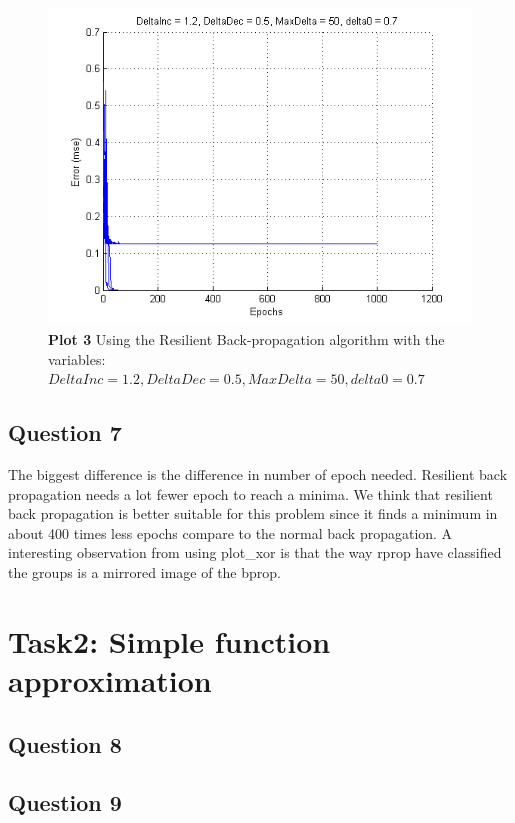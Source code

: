 \documentclass[a4paper]{article}
\begin{document}
\begin{figure}[h!] %
	\caption{\label{fig:plot3_rprop}\textbf{Plot 3} Using the Resilient Back-propagation algorithm with the variables: $DeltaInc = 1.2, DeltaDec = 0.5, MaxDelta = 50, delta0 = 0.7$}
	\includegraphics[]{plot3_rprop.png}
\end{figure}
\subsection*{Question 7}
The biggest difference is the difference in number of epoch needed. Resilient back propagation needs a lot fewer epoch to reach a minima.
We think that resilient back propagation is better suitable for this problem since it finds a minimum in about 400 times less epochs compare to the normal back propagation.
A interesting observation from using plot\_xor is that the way rprop have classified the groups is a mirrored image of the bprop. 

\section{Task2: Simple function approximation}

\subsection*{Question 8}
\subsection*{Question 9}
\end{document}
